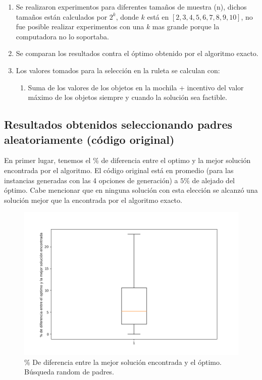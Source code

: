 \documentclass{article}
\begin{document}
		\begin{enumerate}
		\item Se realizaron experimentos para diferentes tamaños de muestra (n), dichos tamaños están calculados por $2^k$, donde $k$ está en $[2,3,4,5,6,7,8,9,10]$, no fue posible realizar experimentos con una $k$ mas grande porque la computadora no lo soportaba.
		\item  Se comparan los resultados contra el óptimo obtenido por el algoritmo exacto.
		\item   Los valores tomados para la selección en la ruleta se calculan con:
		\begin{enumerate}
		\item Suma de los valores de los objetos en la mochila + incentivo del valor máximo de los objetos siempre y cuando la solución sea factible.
		\end{enumerate}
	
		\end{enumerate}
	
    \subsection{Resultados obtenidos seleccionando padres aleatoriamente (código original)}
	
	En primer lugar, tenemos el  $\%$ de diferencia entre el optimo y la mejor solución encontrada por el algoritmo. El código original está en promedio (para las instancias generadas con las 4 opciones de generación) a $5\%$ de alejado del óptimo. Cabe mencionar que en ninguna solución con esta elección se alcanzó una solución mejor que la encontrada por el algoritmo exacto.
	
		\begin{figure}[h!]
		\centering
		\includegraphics[width=0.7\linewidth]{Figure_1.png}
		\caption{\% De diferencia entre la mejor solución encontrada y el óptimo. Búsqueda random de padres.}
		\label{fig:imagen1}
		\end{figure}
	
\end{document}
